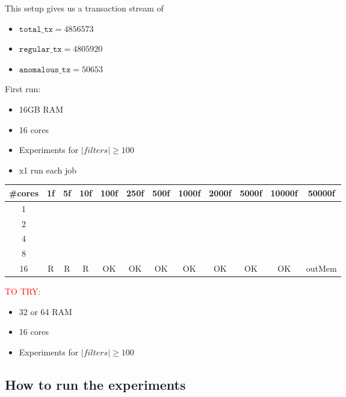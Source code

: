 \documentclass[12pt,a4paper]{article}
\begin{document}
This setup gives us a transaction stream of 
\begin{itemize}
  \item $\texttt{total\_tx} = 4856573$
  \item $\texttt{regular\_tx} = 4805920$
  \item $\texttt{anomalous\_tx} = 50653$
\end{itemize}

First run:
\begin{itemize}
    \item 16GB RAM
    \item 16 cores
    \item Experiments for $|filters|\ge100$
    \item x1 run each job
\end{itemize}

\begin{table}[H]
\begin{tabular}{|c|c|c|c|c|c|c|c|c|c|c|c|}
\hline
\#cores & 1f & 5f & 10f & 100f & 250f & 500f & 1000f & 2000f & 5000f & 10000f & 50000f \\ \hline
1       &    &    &     &      &      &      &       &       &       &        &        \\ \hline
2       &    &    &     &      &      &      &       &       &       &        &        \\ \hline
4       &    &    &     &      &      &      &       &       &       &        &        \\ \hline
8       &    &    &     &      &      &      &       &       &       &        &        \\ \hline
16      & R & R & R & OK & OK & OK & OK & OK & OK & OK & outMem \\ \hline
\end{tabular}
\end{table}

\textcolor{red}{TO TRY:}
\begin{itemize}
    \item 32 or 64 RAM
    \item 16 cores
    \item Experiments for $|filters|\ge100$
\end{itemize}


\subsection{How to run the experiments}
\end{document}
